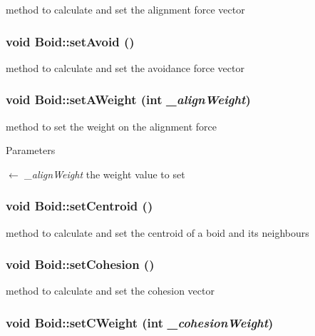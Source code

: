 method to calculate and set the alignment force vector \hypertarget{classBoid_add0e553d230a21b35c6e60d8af5f4b9a}{
\subsubsection[{setAvoid}]{\setlength{\rightskip}{0pt plus 5cm}void Boid::setAvoid ()}}
\label{classBoid_add0e553d230a21b35c6e60d8af5f4b9a}


method to calculate and set the avoidance force vector \hypertarget{classBoid_acc3767ea7aaff905b618aab1dcb8d2e3}{
\subsubsection[{setAWeight}]{\setlength{\rightskip}{0pt plus 5cm}void Boid::setAWeight (int {\em \_\-alignWeight})}}
\label{classBoid_acc3767ea7aaff905b618aab1dcb8d2e3}


method to set the weight on the alignment force 
\begin{DoxyParams}{Parameters}
\item[\mbox{$\leftarrow$} {\em \_\-alignWeight}]the weight value to set \end{DoxyParams}
\hypertarget{classBoid_a213f06454d35d346a3d543b1b63b0272}{
\subsubsection[{setCentroid}]{\setlength{\rightskip}{0pt plus 5cm}void Boid::setCentroid ()}}
\label{classBoid_a213f06454d35d346a3d543b1b63b0272}


method to calculate and set the centroid of a boid and its neighbours \hypertarget{classBoid_af0fb09a2a09da233530c37466ca1e2f2}{
\subsubsection[{setCohesion}]{\setlength{\rightskip}{0pt plus 5cm}void Boid::setCohesion ()}}
\label{classBoid_af0fb09a2a09da233530c37466ca1e2f2}


method to calculate and set the cohesion vector \hypertarget{classBoid_aa2ace7fb25c823079ebdab97dfefdf28}{
\subsubsection[{setCWeight}]{\setlength{\rightskip}{0pt plus 5cm}void Boid::setCWeight (int {\em \_\-cohesionWeight})}}
\label{classBoid_aa2ace7fb25c823079ebdab97dfefdf28}


